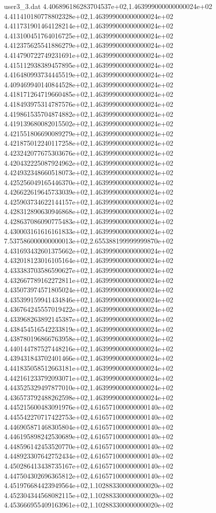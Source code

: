 \begin{filecontents}{user3_3.dat}
4.406896186283704537e+02,1.463999000000000024e+02
4.411410180778802328e+02,1.463999000000000024e+02
4.411731901464128214e+02,1.463999000000000024e+02
4.413100451764016725e+02,1.463999000000000024e+02
4.412375625541886279e+02,1.463999000000000024e+02
4.414790722749231691e+02,1.463999000000000024e+02
4.415112938389457895e+02,1.463999000000000024e+02
4.416480993734445519e+02,1.463999000000000024e+02
4.409469940140844528e+02,1.463999000000000024e+02
4.418171264719660485e+02,1.463999000000000024e+02
4.418493975314787576e+02,1.463999000000000024e+02
4.419861535704874882e+02,1.463999000000000024e+02
4.419139680082015502e+02,1.463999000000000024e+02
4.421551806690089279e+02,1.463999000000000024e+02
4.421875012240117258e+02,1.463999000000000024e+02
4.423242077675303676e+02,1.463999000000000024e+02
4.420432225087924962e+02,1.463999000000000024e+02
4.424932348660518073e+02,1.463999000000000024e+02
4.425256049165446370e+02,1.463999000000000024e+02
4.426622619645733039e+02,1.463999000000000024e+02
4.425903734622144157e+02,1.463999000000000024e+02
4.428312890630946868e+02,1.463999000000000024e+02
4.428637086090775483e+02,1.463999000000000024e+02
4.430003161616161833e+02,1.463999000000000024e+02
7.537586000000000013e+02,2.655388199999999870e+02
4.431693432601375662e+02,1.463999000000000024e+02
4.432018123016105164e+02,1.463999000000000024e+02
4.433383703586590627e+02,1.463999000000000024e+02
4.432667789162272811e+02,1.463999000000000024e+02
4.435073974571805024e+02,1.463999000000000024e+02
4.435399159941434846e+02,1.463999000000000024e+02
4.436764245557019422e+02,1.463999000000000024e+02
4.433968263892145387e+02,1.463999000000000024e+02
4.438454516542233819e+02,1.463999000000000024e+02
4.438780196866763958e+02,1.463999000000000024e+02
4.440144787527448216e+02,1.463999000000000024e+02
4.439431843702401466e+02,1.463999000000000024e+02
4.441835058512663181e+02,1.463999000000000024e+02
4.442161233792093071e+02,1.463999000000000024e+02
4.443525329497877010e+02,1.463999000000000024e+02
4.436573792488262598e+02,1.463999000000000024e+02
4.445215600483091976e+02,4.616571000000000140e+02
4.445542270717422753e+02,4.616571000000000140e+02
4.446905871468305804e+02,4.616571000000000140e+02
4.446195898242530689e+02,4.616571000000000140e+02
4.448596142453520770e+02,4.616571000000000140e+02
4.448923307642752434e+02,4.616571000000000140e+02
4.450286413438735167e+02,4.616571000000000140e+02
4.447504302696365812e+02,4.616571000000000140e+02
4.451976684423949564e+02,1.102883300000000020e+02
4.452304344568082115e+02,1.102883300000000020e+02
4.453666955409163961e+02,1.102883300000000020e+02

\end{filecontents}

